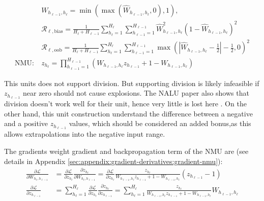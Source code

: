\begin{equation}
\begin{aligned}
&W_{h_{\ell-1},h_\ell} = \min(\max(\hat{W}_{h_{\ell-1},h_\ell}, 0), 1), \\
&\mathcal{R}_{\ell,\mathrm{bias}} = \frac{1}{H_\ell + H_{\ell-1}} \sum_{h_\ell=1}^{H_\ell} \sum_{h_{\ell-1}=1}^{H_{\ell-1}} \hat{W}_{h_{\ell-1},h_\ell}^2 (1 - \hat{W}_{h_{\ell-1},h_\ell})^2 \\
&\mathcal{R}_{\ell,\mathrm{oob}} = \frac{1}{H_\ell + H_{\ell-1}} \sum_{h_\ell=1}^{H_\ell} \sum_{h_{\ell-1}=1}^{H_{\ell-1}} \max\left(\left|\hat{W}_{h_{\ell-1},h_\ell} - \frac{1}{2}\right| - \frac{1}{2}, 0\right)^2 \\
\textrm{NMU}:\ &z_{h_\ell} = \prod_{h_{\ell-1}=1}^{H_{\ell-1}} \left(W_{h_{\ell-1},h_\ell} z_{h_{\ell-1}} + 1 - W_{h_{\ell-1},h_\ell} \right)
\end{aligned}
\end{equation}

This units does not support division. But supporting division is likely infeasible if $z_{h_{\ell-1}}$ near zero should not cause explosions. The NALU paper also shows that division doesn't work well for their unit, hence very little is lost here \cite{trask-nalu}. On the other hand, this unit construction understand the difference between a negative and a positive $z_{h_{\ell-1}}$ values, which should be considered an added bonus,as this allows extrapolations into the negative input range.

The gradients weight gradient and backpropagation term of the NMU are (see details in Appendix \ref{sec:appendix:gradient-derivatives:gradient-nmu}):
\begin{equation}
\begin{aligned}
\frac{\partial \mathcal{L}}{\partial W_{h_{\ell}, h_{\ell - 1}}} &= \frac{\partial \mathcal{L}}{\partial z_{h_\ell}} \frac{\partial z_{h_\ell}}{\partial W_{h_{\ell}, h_{\ell - 1}}} = \frac{\partial \mathcal{L}}{\partial z_{h_\ell}} \frac{z_{h_\ell}}{W_{h_{\ell-1},h_\ell} z_{h_{\ell-1}} + 1 - W_{h_{\ell-1},h_\ell}} \left(z_{h_{\ell-1}} - 1\right) \\
\frac{\partial \mathcal{L}}{\partial z_{h_{\ell-1}}} &= \sum_{h_\ell = 1}^{H_\ell} \frac{\partial \mathcal{L}}{\partial z_{h_\ell}} \frac{\partial z_{h_\ell}}{\partial z_{h_{\ell-1}}} = \sum_{h_\ell = 1}^{H_\ell} \frac{z_{h_\ell}}{W_{h_{\ell-1},h_\ell} z_{h_{\ell-1}} + 1 - W_{h_{\ell-1},h_\ell}} W_{h_{\ell-1},h_\ell}
\end{aligned}
\end{equation}

